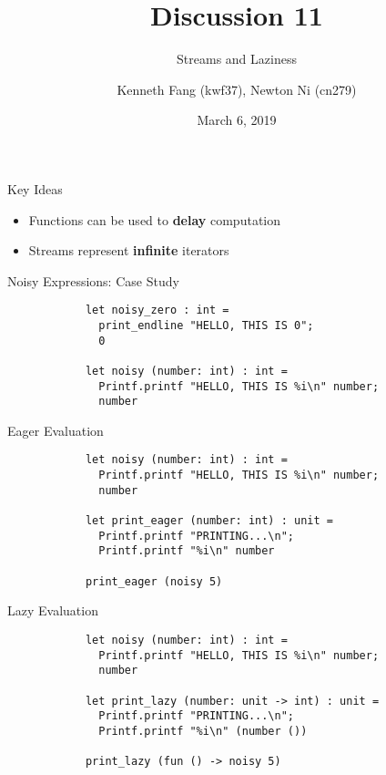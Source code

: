 \documentclass{beamer}
\title{Discussion 11}
\subtitle{Streams and Laziness}
\author{Kenneth Fang (kwf37), Newton Ni (cn279)}
\date{March 6, 2019}
\begin{document}
    \begin{frame}
        \titlepage{}
    \end{frame}

    \begin{frame}{Key Ideas}
        \begin{itemize}
            \item Functions can be used to \textbf{delay} computation
            \item Streams represent \textbf{infinite} iterators
        \end{itemize}
    \end{frame}

    \begin{frame}[fragile=singleslide]{Noisy Expressions: Case Study}
        \begin{verbatim}
            let noisy_zero : int =
              print_endline "HELLO, THIS IS 0";
              0

            let noisy (number: int) : int =
              Printf.printf "HELLO, THIS IS %i\n" number;
              number
        \end{verbatim}
    \end{frame}

    \begin{frame}[fragile=singleslide]{Eager Evaluation}
        \begin{verbatim}
            let noisy (number: int) : int =
              Printf.printf "HELLO, THIS IS %i\n" number;
              number

            let print_eager (number: int) : unit =
              Printf.printf "PRINTING...\n";
              Printf.printf "%i\n" number

            print_eager (noisy 5)
        \end{verbatim}
    \end{frame}

    \begin{frame}[fragile=singleslide]{Lazy Evaluation}
        \begin{verbatim}
            let noisy (number: int) : int =
              Printf.printf "HELLO, THIS IS %i\n" number;
              number

            let print_lazy (number: unit -> int) : unit =
              Printf.printf "PRINTING...\n";
              Printf.printf "%i\n" (number ())

            print_lazy (fun () -> noisy 5)
        \end{verbatim}
    \end{frame}
\end{document}
